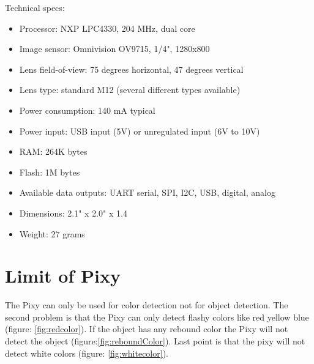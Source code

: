 \documentclass[english]{book_template} %
\begin{document}
\begin{description}
	\item[Technical specs:]
\end{description}
\begin{itemize}
\item Processor: NXP LPC4330, 204 MHz, dual core
\item Image sensor: Omnivision OV9715, 1/4", 1280x800
\item Lens field-of-view: 75 degrees horizontal, 47 degrees vertical
\item Lens type: standard M12 (several different types available)
\item Power consumption: 140 mA typical
\item Power input: USB input (5V) or unregulated input (6V to 10V)
\item RAM: 264K bytes
\item Flash: 1M bytes
\item Available data outputs: UART serial, SPI, I2C, USB, digital, analog
\item Dimensions: 2.1" x 2.0" x 1.4
\item Weight: 27 grams
\end{itemize}

\section{Limit of Pixy}

The Pixy can only be used for color detection not for object detection. The second problem is that the Pixy can only detect flashy colors like red yellow blue (figure: \ref{fig:redcolor}). If the object has any rebound color the Pixy will not detect the object (figure:\ref{fig:reboundColor}). Last point is that the pixy will not detect white colors (figure: \ref{fig:whitecolor}). 
\end{document}
